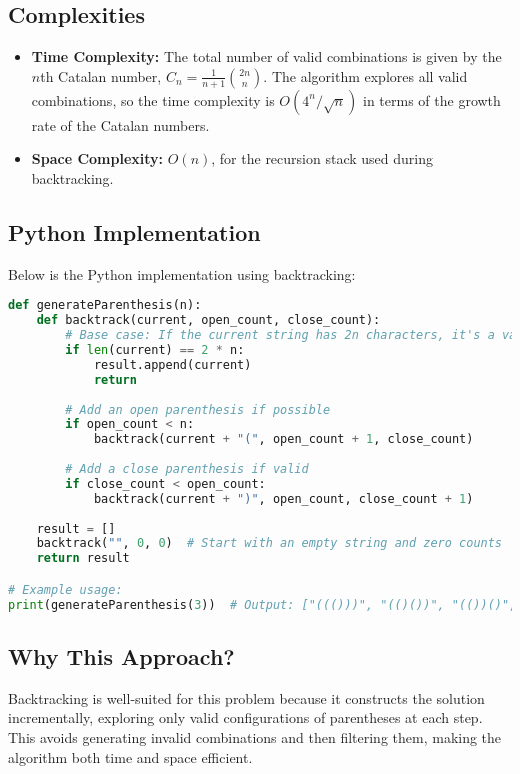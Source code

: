 \subsection*{Complexities}
\begin{itemize}
    \item \textbf{Time Complexity:} The total number of valid combinations is given by the \( n \)th Catalan number, \( C_n = \frac{1}{n+1} \binom{2n}{n} \). The algorithm explores all valid combinations, so the time complexity is \( O(4^n / \sqrt{n}) \) in terms of the growth rate of the Catalan numbers.
    \item \textbf{Space Complexity:} \( O(n) \), for the recursion stack used during backtracking.
\end{itemize}

\subsection*{Python Implementation}
Below is the Python implementation using backtracking:

\begin{fullwidth}
\begin{lstlisting}[language=Python]
def generateParenthesis(n):
    def backtrack(current, open_count, close_count):
        # Base case: If the current string has 2n characters, it's a valid combination
        if len(current) == 2 * n:
            result.append(current)
            return
        
        # Add an open parenthesis if possible
        if open_count < n:
            backtrack(current + "(", open_count + 1, close_count)
        
        # Add a close parenthesis if valid
        if close_count < open_count:
            backtrack(current + ")", open_count, close_count + 1)
    
    result = []
    backtrack("", 0, 0)  # Start with an empty string and zero counts
    return result

# Example usage:
print(generateParenthesis(3))  # Output: ["((()))", "(()())", "(())()", "()(())", "()()()"]
\end{lstlisting}
\end{fullwidth}

\subsection*{Why This Approach?}
Backtracking is well-suited for this problem because it constructs the solution incrementally, exploring only valid configurations of parentheses at each step. This avoids generating invalid combinations and then filtering them, making the algorithm both time and space efficient.

